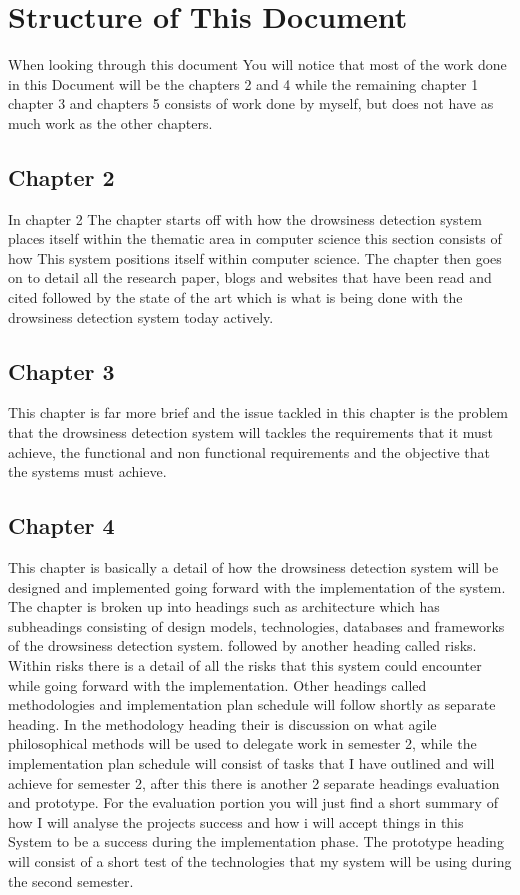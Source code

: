 \section{Structure of This Document}
When looking through this document You will notice that most of the work done in this Document will be the chapters 2 and 4 while the remaining chapter 1  chapter 3 and chapters 5 consists of work done by myself, but does not have as much work as the other chapters.
\subsection{Chapter 2}
In chapter 2  The chapter starts off with how the drowsiness detection system places itself within the thematic area in computer science this section consists of how This system positions itself within computer science. The chapter then goes on to detail all the research paper, blogs and websites that have been read and cited followed by the state of the art which is what is being done with the drowsiness detection system today actively.
\subsection{Chapter 3}
This chapter is far more brief and the issue tackled in this chapter is the problem that the drowsiness detection system will tackles the requirements that it must achieve, the functional and non functional requirements and the objective that the systems  must achieve.
\subsection{Chapter 4}
This chapter is basically a detail of how the drowsiness detection system will be designed and implemented going forward with the implementation of the system. The chapter is broken up into  headings such as architecture which has subheadings consisting of design models, technologies, databases and frameworks of the drowsiness detection system. followed by another heading called risks. Within risks there is a detail of all the risks that this system could encounter while going forward with the implementation. Other headings called methodologies and implementation plan schedule will follow shortly as separate heading. In the methodology heading their is discussion on what agile philosophical methods will be used to delegate work in semester 2, while the implementation plan schedule will consist of tasks that I have outlined and will achieve for semester 2, after this there is another 2 separate headings evaluation and prototype. For the evaluation portion you will just find a short summary of how I will analyse the projects success and how i will accept things in this System to be a success during the implementation phase. The prototype heading will consist of a short test of the technologies that my system will be using during the second semester.
